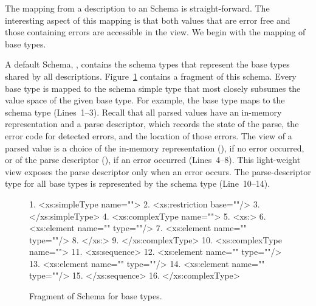 The mapping from a \pads{} description to an \Xml{} Schema is 
straight-forward.  The interesting aspect of this mapping is that both
\pads{} values that are error free and those containing errors are
accessible in the \Xml{} view.  We begin with the mapping of \pads{} base
types. 

A default \Xml{} Schema, , contains the schema types that
represent the \pads{} base types shared by all \pads{} descriptions.
Figure~\ref{figure:pads.xsd} contains a fragment of this schema.
Every \pads{} base type is mapped to the schema simple type that most
closely subsumes the value space of the given \pads{} base type.  For example,
the  base type maps to the schema type 
(Lines~1--3).  Recall that all parsed \pads{} values have an in-memory
representation and a parse descriptor, which records the state of the
parse, the error code for detected errors, and the location of those
errors.  The \Xml{} view of a parsed value is a choice of the in-memory
representation (), if no error occurred, or of the parse
descriptor (), if
an error occurred (Lines~4--8).  This light-weight view exposes the
parse descriptor only when an error occurs.  The parse-descriptor type
for all base types is represented by the schema type
 (Line~10--14).

\begin{figure}
\begin{small}
\begin{code}
 1. <xs:simpleType name="">
 2.  <xs:restriction base=""/>
 3. </xs:simpleType>
 4. <xs:complexType name="">
 5.  <xs:>
 6.   <xs:element name="" type=""/>
 7.   <xs:element name=""  type=""/>
 8.  </xs:>
 9. </xs:complexType>
{10}. <xs:complexType name="">
{11}.  <xs:sequence>
{12}.   <xs:element name=""  type=""/>
{13}.   <xs:element name="" type=""/>
{14}.   <xs:element name=""     type=""/>
{15}.  </xs:sequence>
{16}. </xs:complexType>
\end{code}
\end{small}
\caption{Fragment of \Xml{} Schema for \pads{} base types.}
\label{figure:pads.xsd}
\end{figure}

